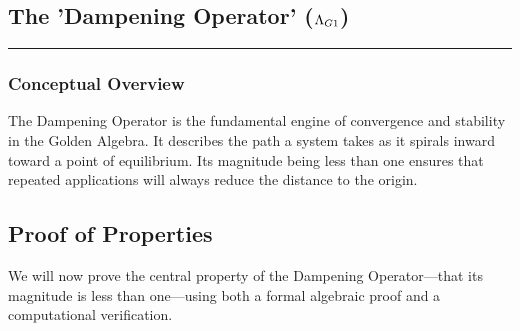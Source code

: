 
















\subsection*{The 'Dampening Operator' ($\Lambda_{G1}$)}
\hrule
\vspace{0.3cm}
\vspace{0.5cm}

\subsubsection*{Conceptual Overview}
The Dampening Operator is the fundamental engine of convergence and stability in the Golden Algebra. It describes the path a system takes as it spirals inward toward a point of equilibrium. Its magnitude being less than one ensures that repeated applications will always reduce the distance to the origin.

\subsection*{Proof of Properties}
We will now prove the central property of the Dampening Operator—that its magnitude is less than one—using both a formal algebraic proof and a computational verification.

